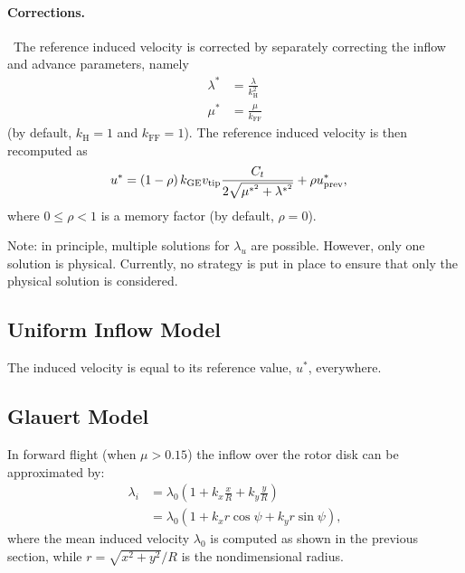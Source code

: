 \paragraph{Corrections.} \
The reference induced velocity is corrected by separately correcting
the inflow and advance parameters, namely
\begin{subequations}
\begin{align}
	\lambda^*
	&=
	\frac{\lambda}{k_\text{H}^2}
	\\
	\mu^*
	&=
	\frac{\mu}{k_\text{FF}}
\end{align}
\end{subequations}
(by default, $k_\text{H}=1$ and $k_\text{FF}=1$).
The reference induced velocity is then recomputed as
\begin{align}
	u^*
	&=
	\left( 1 - \rho \right) k_\text{GE} v_\text{tip}
		\frac{C_t}{2 \sqrt{\mu^{*^2} + \lambda^{*^2}}}
	+ \rho u^*_\text{prev}
	,
\end{align}
where $0 \le \rho < 1$ is a memory factor (by default, $\rho=0$).

Note: in principle, multiple solutions for $\lambda_u$ are possible.
However, only one solution is physical.
Currently, no strategy is put in place to ensure that only the physical
solution is considered.


\subsection{Uniform Inflow Model}

The induced velocity is equal to its reference value, $u^*$, everywhere.


\subsection{Glauert Model}

In forward flight (when $\mu > 0.15$) the inflow over the rotor disk can 
be approximated by:
\begin{align}
\lambda_i &= \lambda_0 \left( 1 + k_x \frac{x}{R} + k_y \frac{y}{R} \right)
\\
&= \lambda_0 \left( 1 + k_x r \cos{\psi} + k_y r \sin{\psi} \right),
\end{align}
where the mean induced velocity $\lambda_0$ is computed as shown in the
previous section,
while $r=\sqrt{x^2 + y^2}/R$ is the nondimensional radius.

